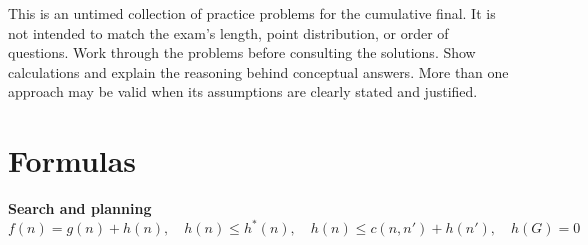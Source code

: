 \documentclass[11pt]{article}
\title{\textbf{\coursenumber:} #1}
\author{\textbf{Due} #2\\
  }
\date{}
\begin{document}
\begin{framed}
This is an untimed collection of practice problems for the cumulative
final. It is not intended to match the exam's length, point distribution,
or order of questions. Work through the problems before consulting the
solutions. Show calculations and explain the reasoning behind conceptual
answers. More than one approach may be valid when its assumptions are
clearly stated and justified.
\end{framed}
\clearpage
\section*{Formulas}
\begingroup
\small
\setlength{\abovedisplayskip}{4pt}
\setlength{\belowdisplayskip}{4pt}
\textbf{Search and planning}
\[
 f(n)=g(n)+h(n),\quad h(n)\le h^*(n),\quad
 h(n)\le c(n,n')+h(n'),\quad h(G)=0
\]
\end{document}
